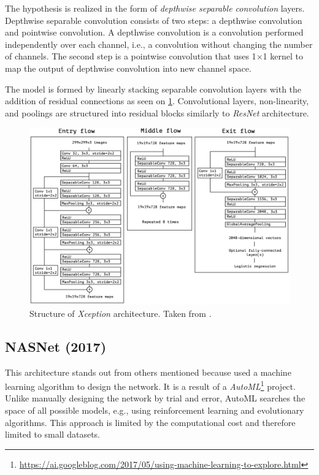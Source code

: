 The hypothesis is realized in the form of \textit{depthwise separable convolution} layers. Depthwise separable convolution consists of two steps: a depthwise convolution and pointwise convolution. A depthwise convolution is a convolution performed independently over each channel, i.e., a convolution without changing the number of channels. The second step is a pointwise convolution that uses 1$\times$1 kernel to map the output of depthwise convolution into new channel space.

The model is formed by linearly stacking separable convolution layers with the addition of residual connections as seen on \cref{fig:xception}. Convolutional layers, non-linearity, and poolings are structured into residual blocks similarly to \textit{ResNet} architecture.

\begin{figure}
    \includegraphics[width=\textwidth]{img/xception}
    \caption[Xception architecture]%
    {Structure of \textit{Xception} architecture. Taken from \cite[fig. 5]{bib:xception}.}
    \label{fig:xception}
\end{figure}


\subsection{NASNet (2017)}
\label{sec:nasnet}
This architecture stands out from others mentioned because \citeauthor{bib:nasnet} \cite{bib:nasnet} used a machine learning algorithm to design the network. It is a result of a \textit{AutoML}\footnote{\url{https://ai.googleblog.com/2017/05/using-machine-learning-to-explore.html}} project. Unlike manually designing the network by trial and error, AutoML searches the space of all possible models, e.g., using reinforcement learning and evolutionary algorithms. This approach is limited by the computational cost and therefore limited to small datasets.

